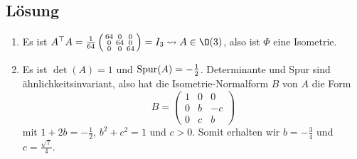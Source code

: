 \subsection{Lösung}
\begin{enumerate}
	\item Es ist \( A^\top A = \tfrac{1}{64}\left( \begin{smallmatrix}
		64 & 0 & 0 \\
		0 & 64 & 0 \\
		0 & 0 & 64
	\end{smallmatrix} \right) = I_3 \leadsto A \in \O(3) \), also ist \( \Phi \) eine Isometrie.

	\item Es ist \( \det(A)=1 \) und \( \text{Spur}(A) = -\tfrac{1}{2} \). Determinante und Spur sind ähnlichkeitsinvariant, also hat die Isometrie-Normalform \( B \) von \( A \) die Form
	\begin{equation*}
		B = \left( \begin{smallmatrix}
			1 & 0 & 0 \\
			0 & b & -c \\
			0 & c & b
		\end{smallmatrix} \right)
	\end{equation*}
	mit \( 1+2b = -\tfrac{1}{2} \), \( b^2+c^2=1 \) und \( c > 0 \). Somit erhalten wir \( b = -\tfrac{3}{4} \) und \( c = \tfrac{\sqrt{7}}{4} \).


\end{enumerate}

